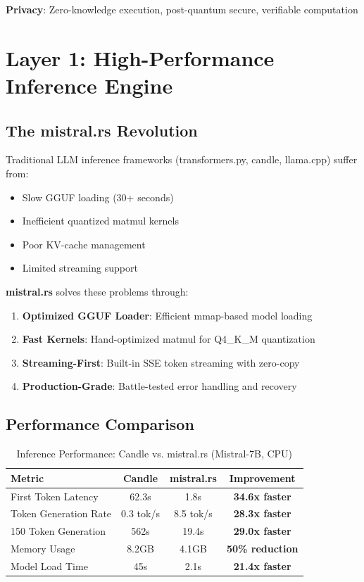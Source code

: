 \documentclass[11pt,a4paper]{article}
\begin{document}
\textbf{Privacy}: Zero-knowledge execution, post-quantum secure, verifiable computation

\newpage
\section{Layer 1: High-Performance Inference Engine}

\subsection{The mistral.rs Revolution}

Traditional LLM inference frameworks (transformers.py, candle, llama.cpp) suffer from:
\begin{itemize}
    \item Slow GGUF loading (30+ seconds)
    \item Inefficient quantized matmul kernels
    \item Poor KV-cache management
    \item Limited streaming support
\end{itemize}

\textbf{mistral.rs} solves these problems through:

\begin{enumerate}
    \item \textbf{Optimized GGUF Loader}: Efficient mmap-based model loading
    \item \textbf{Fast Kernels}: Hand-optimized matmul for Q4\_K\_M quantization
    \item \textbf{Streaming-First}: Built-in SSE token streaming with zero-copy
    \item \textbf{Production-Grade}: Battle-tested error handling and recovery
\end{enumerate}

\subsection{Performance Comparison}

\begin{table}[H]
\centering
\caption{Inference Performance: Candle vs. mistral.rs (Mistral-7B, CPU)}
\label{tab:performance}
\begin{tabular}{|l|c|c|c|}
\hline
\textbf{Metric} & \textbf{Candle} & \textbf{mistral.rs} & \textbf{Improvement} \\
\hline
First Token Latency & 62.3s & 1.8s & \textbf{34.6x faster} \\
Token Generation Rate & 0.3 tok/s & 8.5 tok/s & \textbf{28.3x faster} \\
150 Token Generation & 562s & 19.4s & \textbf{29.0x faster} \\
Memory Usage & 8.2GB & 4.1GB & \textbf{50\% reduction} \\
Model Load Time & 45s & 2.1s & \textbf{21.4x faster} \\
\hline
\end{tabular}
\end{table}
\end{document}
